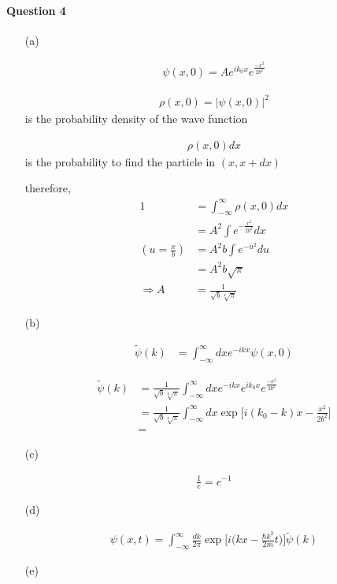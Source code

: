 \documentclass[11pt,a4paper]{article}
\begin{document}
\newpage

\paragraph{Question 4}

\begin{enumerate}
\item[(a)]

\begin{align}
    \psi(x,0)=Ae^{ik_0x}e^{\frac{-x^2}{2b^2}}
\end{align}

\begin{align}
    \rho(x,0)=|\psi(x,0)|^2
\end{align}
is the probability density of the wave function

\begin{align}
    \rho(x,0)dx
\end{align}
is the probability to find the particle in $(x,x+dx)$

therefore,
    \begin{align}
    1&=\int_{-\infty}^\infty\rho(x,0)dx\\
    &=A^2\int e^{-\frac{x^2}{2b^2}}dx\\
    (u=\frac{x}{b})&=A^2b\int e^{-u^2}du\\
    &=A^2b\sqrt{\pi}\\
    \Rightarrow A&=\frac{1}{\sqrt{b}\sqrt[4]{\pi}}
\end{align}

\item[(b)]

\begin{align}
    \tilde{\psi}(k)&=\int^\infty_{-\infty} dx e^{-ikx}\psi(x,0)
\end{align}

\begin{align}
    \tilde{\psi}(k)
    &=\frac{1}{\sqrt{b}\sqrt[4]{\pi}}\int^\infty_{-\infty} dx e^{-ikx}e^{ik_0x}e^{\frac{-x^2}{2b^2}}\\
    &=\frac{1}{\sqrt{b}\sqrt[4]{\pi}}\int^\infty_{-\infty} dx \exp{\bigg[i(k_0-k)x-\frac{x^2}{2b^2}\bigg]}\\
    &=
\end{align}

\item[(c)]

\begin{align}
    \frac{1}{e}=e^{-1}
\end{align}

\item[(d)]

\begin{align}
    \psi(x,t)=\int^\infty_{-\infty} \frac{dk}{2\pi}\exp{\bigg[i\bigg(kx-\frac{\hbar k^2}{2m}t\bigg)\bigg]}\tilde{\psi}(k)
\end{align}

\item[(e)]

\end{enumerate}
\end{document}
